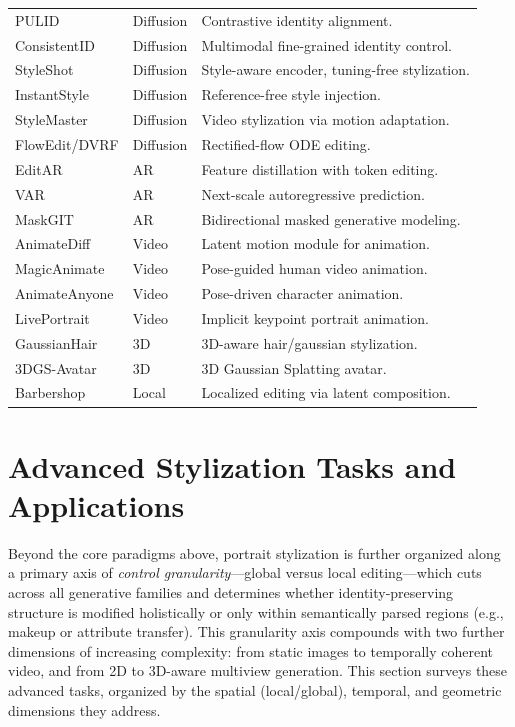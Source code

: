 \documentclass[journal]{IEEEtran}
\begin{document}
\begin{table}[t]
\begin{tabular}{llp{9.0cm}}
PULID \cite{guo2024pulid} & Diffusion & Contrastive identity alignment. \\
ConsistentID \cite{huang2024consistentid} & Diffusion & Multimodal fine-grained identity control. \\
StyleShot \cite{gao2024styleshot} & Diffusion & Style-aware encoder, tuning-free stylization. \\
InstantStyle \cite{wang2025instantstyleplus} & Diffusion & Reference-free style injection. \\
StyleMaster \cite{ye2024stylemastersy} & Diffusion & Video stylization via motion adaptation. \\
FlowEdit/DVRF \cite{flowedit2025,dvrf2025} & Diffusion & Rectified-flow ODE editing. \\
\midrule
EditAR \cite{mu2025editar} & AR & Feature distillation with token editing. \\
VAR \cite{tian2024var} & AR & Next-scale autoregressive prediction. \\
MaskGIT \cite{chang2022maskgit} & AR & Bidirectional masked generative modeling. \\
\midrule
AnimateDiff \cite{guo2024animatediff} & Video & Latent motion module for animation. \\
MagicAnimate \cite{xu2024magicanimate} & Video & Pose-guided human video animation. \\
AnimateAnyone \cite{hu2024animateanyone} & Video & Pose-driven character animation. \\
LivePortrait \cite{guo2024liveportrait} & Video & Implicit keypoint portrait animation. \\
\midrule
GaussianHair \cite{luo2024gaussianhair} & 3D & 3D-aware hair/gaussian stylization. \\
3DGS-Avatar \cite{qian20243dgsavatar} & 3D & 3D Gaussian Splatting avatar. \\
\midrule
Barbershop \cite{zhu2021barbershop} & Local & Localized editing via latent composition. \\
\bottomrule
\end{tabular}
\end{table}

\section{Advanced Stylization Tasks and Applications}
\label{sec:advanced}
Beyond the core paradigms above, portrait stylization is further organized along a primary axis of \textit{control granularity}---global versus local editing---which cuts across all generative families and determines whether identity-preserving structure is modified holistically or only within semantically parsed regions (e.g., makeup or attribute transfer). This granularity axis compounds with two further dimensions of increasing complexity: from static images to temporally coherent video, and from 2D to 3D-aware multiview generation. This section surveys these advanced tasks, organized by the spatial (local/global), temporal, and geometric dimensions they address.
\end{document}
